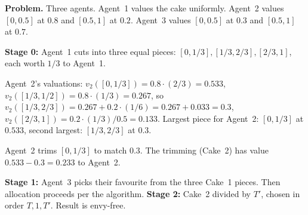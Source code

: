 \separator

\begin{exbox}
\textbf{Problem.} Three agents. Agent~1 values the cake uniformly. Agent~2 values $[0, 0.5]$ at $0.8$ and $[0.5, 1]$ at $0.2$. Agent~3 values $[0, 0.5]$ at $0.3$ and $[0.5, 1]$ at $0.7$.

\textbf{Stage 0:} Agent~1 cuts into three equal pieces: $[0, 1/3], [1/3, 2/3], [2/3, 1]$, each worth $1/3$ to Agent~1.

Agent~2's valuations: $v_2([0, 1/3]) = 0.8 \cdot (2/3) = 0.533$, $v_2([1/3, 1/2]) = 0.8 \cdot (1/3) = 0.267$, so $v_2([1/3, 2/3]) = 0.267 + 0.2 \cdot (1/6) = 0.267 + 0.033 = 0.3$, $v_2([2/3, 1]) = 0.2 \cdot (1/3)/0.5 = 0.133$. Largest piece for Agent~2: $[0, 1/3]$ at $0.533$, second largest: $[1/3, 2/3]$ at $0.3$.

Agent~2 trims $[0, 1/3]$ to match $0.3$. The trimming (Cake~2) has value $0.533 - 0.3 = 0.233$ to Agent~2.

\textbf{Stage 1:} Agent~3 picks their favourite from the three Cake~1 pieces. Then allocation proceeds per the algorithm. \textbf{Stage 2:} Cake~2 divided by $T'$, chosen in order $T, 1, T'$. Result is envy-free.
\end{exbox}
